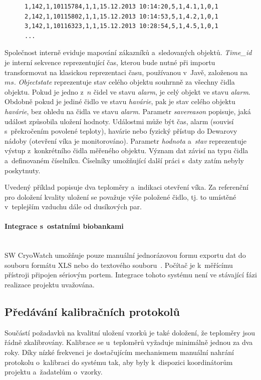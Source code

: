 \documentclass[11pt, final, oneside]{fithesis2}
\newcommand{\paragraphNewLine}[1]{\paragraph*{#1}\mbox{}\\}
\begin{document}

\begin{figure}[ht!]
\centering
\begin{BVerbatim}
1,142,1,10115784,1,1,15.12.2013 10:14:20,5,1,4.1,1,0,1
2,142,1,10115802,1,1,15.12.2013 10:14:53,5,1,4.2,1,0,1
3,142,1,10116323,1,1,15.12.2013 10:28:54,5,1,4.5,1,0,1
...
\end{BVerbatim}
\end{figure}

Společnost interně eviduje mapování zákazníků a~sledovaných objektů. 
\textit{Time\_id} je interní sekvence reprezentující čas, kterou bude nutné při importu transformovat na klasickou reprezentaci času, používanou v~Javě, založenou na $ms$. \textit{Objectstate} reprezentuje stav celého objektu souhrnně za všechny čidla objektu. Pokud je jedno z~$n$ čidel ve stavu \textit{alarm}, je celý objekt ve stavu \textit{alarm}. Obdobně pokud je jediné čidlo ve stavu \textit{havárie}, pak je stav celého objektu \textit{havárie}, bez ohledu na čidla ve stavu \textit{alarm}. Parametr \textit{savereason} popisuje, jaká událost způsobila uložení hodnoty. Událostmi může být čas, alarm (souvisí s~překročením povolené teploty), havárie nebo fyzický přístup do Dewarovy nádoby (otevření víka je monitorováno). Parametr \textit{hodnota} a~\textit{stav} reprezentuje výstup z~konkrétního čidla měřeného objektu. Význam dat závisí na typu čidla a~definovaném číselníku. Číselníky umožňující další práci s~daty zatím nebyly poskytnuty.

Uvedený příklad popisuje dva teploměry a~indikaci otevření víka. Za referenční pro doložení kvality uložení se považuje výše položené čidlo, tj. to umístěné v~teplejším vzduchu dále od dusíkových par. 

\paragraphNewLine{Integrace s~ostatními biobankami}
SW CryoWatch umožňuje pouze manuální jednorázovou formu exportu dat do souboru formátu XLS nebo do textového souboru~\cite{M355CE}. Počítač je k~měřícímu přístroji připojen sériovým portem. Integrace tohoto systému není ve stávající fázi realizace projektu uvažována. 

\subsection{Předávání kalibračních protokolů}
Součástí požadavků na kvalitní uložení vzorků je také doložení, že teploměry jsou řádně zkalibrovány. Kalibrace se u~teploměrů vyžaduje minimálně jednou za dva roky. Díky nízké frekvenci je dostačujícím mechanismem manuální nahrání protokolu o~kalibraci do systému tak, aby byly k~dispozici koordinátorům projektu a~žadatelům o~vzorky.
\end{document}
